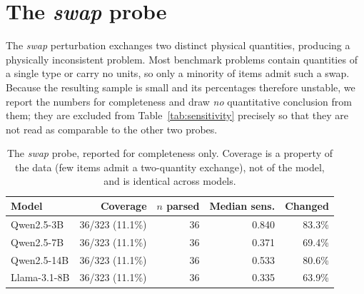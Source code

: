 \section{The \emph{swap} probe}
\label{app:swap}
The \emph{swap} perturbation exchanges two distinct physical quantities, producing a
physically inconsistent problem. Most benchmark problems contain quantities of a
single type or carry no units, so only a minority of items admit such a swap. Because
the resulting sample is small and its percentages therefore unstable, we report the
numbers for completeness and draw \emph{no} quantitative conclusion from them; they
are excluded from Table~\ref{tab:sensitivity} precisely so that they are not read as
comparable to the other two probes.

\begin{table}[h]
  \centering
  \caption{The \emph{swap} probe, reported for completeness only. Coverage is a
           property of the data (few items admit a two-quantity exchange), not of the
           model, and is identical across models.}
  \label{tab:swap}
  \small
  \begin{tabular}{@{}l r r r r@{}}
    \toprule
    \textbf{Model} & \textbf{Coverage} & \textbf{$n$ parsed} & \textbf{Median sens.} &
      \textbf{Changed} \\
    \midrule
    Qwen2.5-3B & 36/323 (11.1\%) & 36 & 0.840 & 83.3\% \\
    Qwen2.5-7B & 36/323 (11.1\%) & 36 & 0.371 & 69.4\% \\
    Qwen2.5-14B & 36/323 (11.1\%) & 36 & 0.533 & 80.6\% \\
    Llama-3.1-8B & 36/323 (11.1\%) & 36 & 0.335 & 63.9\% \\
    \bottomrule
  \end{tabular}
\end{table}

